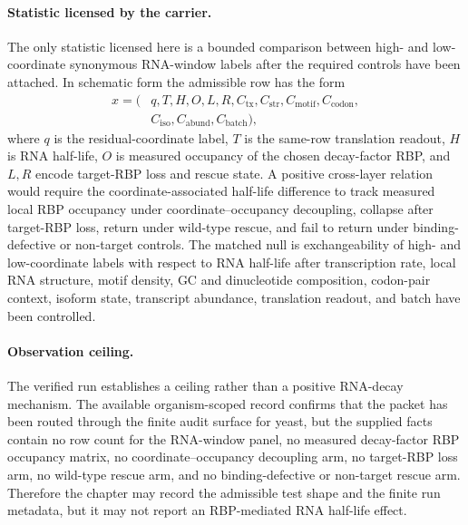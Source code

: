 \paragraph{Statistic licensed by the carrier.}
The only statistic licensed here is a bounded comparison between high- and low-coordinate synonymous RNA-window labels after the required controls have been attached.  In schematic form the admissible row has the form
$$
\begin{aligned}
  x = (&q, T, H, O, L, R, C_{\mathrm{tx}}, C_{\mathrm{str}}, C_{\mathrm{motif}}, C_{\mathrm{codon}}, \\
       &C_{\mathrm{iso}}, C_{\mathrm{abund}}, C_{\mathrm{batch}}),
\end{aligned}
$$
where $q$ is the residual-coordinate label, $T$ is the same-row translation readout, $H$ is RNA half-life, $O$ is measured occupancy of the chosen decay-factor RBP, and $L,R$ encode target-RBP loss and rescue state.  A positive cross-layer relation would require the coordinate-associated half-life difference to track measured local RBP occupancy under coordinate--occupancy decoupling, collapse after target-RBP loss, return under wild-type rescue, and fail to return under binding-defective or non-target controls.  The matched null is exchangeability of high- and low-coordinate labels with respect to RNA half-life after transcription rate, local RNA structure, motif density, GC and dinucleotide composition, codon-pair context, isoform state, transcript abundance, translation readout, and batch have been controlled.

\paragraph{Observation ceiling.}
The verified run establishes a ceiling rather than a positive RNA-decay mechanism.  The available organism-scoped record confirms that the packet has been routed through the finite audit surface for yeast, but the supplied facts contain no row count for the RNA-window panel, no measured decay-factor RBP occupancy matrix, no coordinate--occupancy decoupling arm, no target-RBP loss arm, no wild-type rescue arm, and no binding-defective or non-target rescue arm.  Therefore the chapter may record the admissible test shape and the finite run metadata, but it may not report an RBP-mediated RNA half-life effect.

